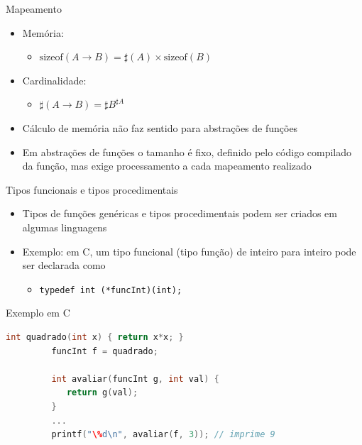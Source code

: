 \documentclass[handout]{beamer}
\begin{document}
\begin{frame}{Mapeamento}
		\begin{itemize}
			\item Memória:
				\begin{itemize}
					\item $\mathrm{sizeof}(A \rightarrow B) = \sharp(A) \times \mathrm{sizeof}(B)$
				\end{itemize}

			\item Cardinalidade:
				\begin{itemize}
					\item $\sharp(A \rightarrow B) = \sharp B ^{\sharp A}$
				\end{itemize}
			\item Cálculo de memória não faz sentido para abstrações de funções
			\item Em abstrações de funções o tamanho é fixo, definido pelo código compilado da função, mas exige processamento a cada mapeamento realizado

		\end{itemize}
 \end{frame}



\begin{frame}[fragile]{Tipos funcionais e tipos procedimentais}
		\begin{itemize}
			\item Tipos de funções genéricas e tipos procedimentais podem ser criados em algumas linguagens
			\item Exemplo: em C, um tipo funcional (tipo função) de inteiro para inteiro pode ser declarada como
				\begin{itemize}
					\item \texttt{typedef int (*funcInt)(int);}
				\end{itemize}
		\end{itemize}
    \begin{block}{Exemplo em C}
      \begin{lstlisting}[language=c,numbers=none]
         int quadrado(int x) { return x*x; }
         funcInt f = quadrado;

         int avaliar(funcInt g, int val) {
            return g(val);
         }
         ...
         printf("\%d\n", avaliar(f, 3)); // imprime 9

      \end{lstlisting}
    \end{block}
\end{frame}
\end{document}
